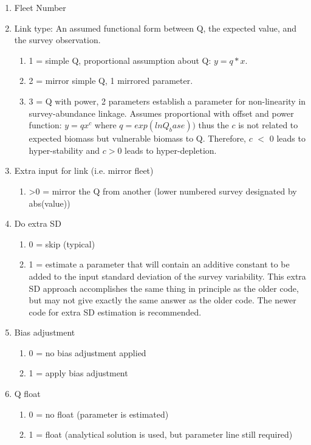 \begin{enumerate}
	\item Fleet Number
	\item Link type: An assumed functional form between Q, the expected value, and the survey observation.
	\begin{enumerate}
		\item 1 = simple Q, proportional assumption about Q: $y=q*x$.
		\item 2 = mirror simple Q, 1 mirrored parameter.  
		\item 3 = Q with power, 2 parameters establish a parameter for non-linearity in survey-abundance linkage.  Assumes proportional with offset and power function: $y=qx^c$ where $q = exp(lnQ_base))$ thus the $c$ is not related to expected biomass but vulnerable biomass to Q.  Therefore, $c$ $<$ 0 leads to hyper-stability and $c > 0$ leads to hyper-depletion.
	\end{enumerate}
	\item Extra input for link (i.e. mirror fleet)
	\begin{enumerate}
		\item >0 = mirror the Q from another (lower numbered survey designated by abs(value))
	\end{enumerate}
	\item Do extra SD
	\begin{enumerate}
		\item 0 = skip (typical)
		\item 1 = estimate a parameter that will contain an additive constant to be added to the input standard deviation of the survey variability.  This extra SD approach accomplishes the same thing in principle as the older code, but may not give exactly the same answer as the older code.  The newer code for extra SD estimation is recommended.
	\end{enumerate}
	\item Bias adjustment
	\begin{enumerate}
		\item 0 = no bias adjustment applied
		\item 1 = apply bias adjustment
	\end{enumerate}
	\item Q float
	\begin{enumerate}
		\item 0 = no float (parameter is estimated)
		\item 1 = float (analytical solution is used, but parameter line still required)
	\end{enumerate}
\end{enumerate}




